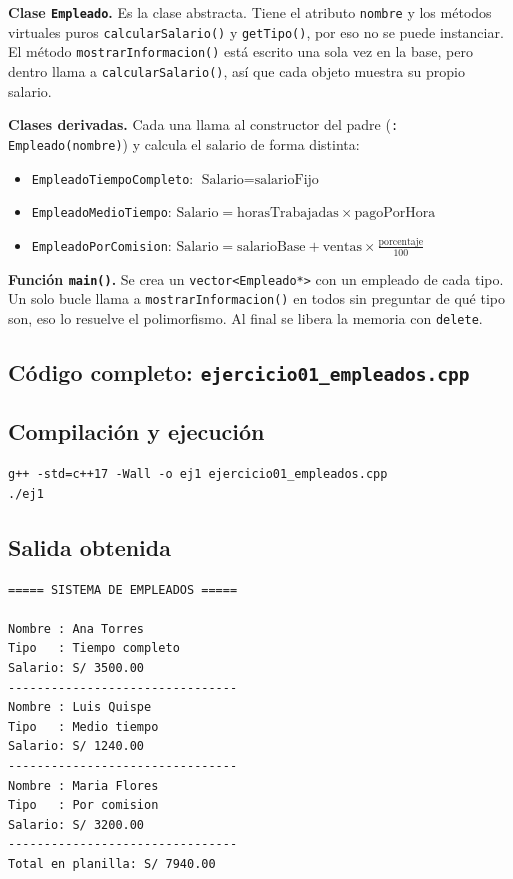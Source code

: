 \documentclass[12pt]{article}
\begin{document}
\textbf{Clase \texttt{Empleado}.} Es la clase abstracta. Tiene el atributo \texttt{nombre} y los métodos virtuales puros \texttt{calcularSalario()} y \texttt{getTipo()}, por eso no se puede instanciar. El método \texttt{mostrarInformacion()} está escrito una sola vez en la base, pero dentro llama a \texttt{calcularSalario()}, así que cada objeto muestra su propio salario.

\textbf{Clases derivadas.} Cada una llama al constructor del padre (\texttt{: Empleado(nombre)}) y calcula el salario de forma distinta:
\begin{itemize}[leftmargin=0.5cm]
    \item \texttt{EmpleadoTiempoCompleto}: $\text{Salario} = \text{salarioFijo}$
    \item \texttt{EmpleadoMedioTiempo}: $\text{Salario} = \text{horasTrabajadas} \times \text{pagoPorHora}$
    \item \texttt{EmpleadoPorComision}: $\text{Salario} = \text{salarioBase} + \text{ventas} \times \frac{\text{porcentaje}}{100}$
\end{itemize}

\textbf{Función \texttt{main()}.} Se crea un \texttt{vector<Empleado*>} con un empleado de cada tipo. Un solo bucle llama a \texttt{mostrarInformacion()} en todos sin preguntar de qué tipo son, eso lo resuelve el polimorfismo. Al final se libera la memoria con \texttt{delete}.

\subsection*{Código completo: \texttt{ejercicio01\_empleados.cpp}}



\subsection*{Compilación y ejecución}

\begin{lstlisting}[style=consola]
g++ -std=c++17 -Wall -o ej1 ejercicio01_empleados.cpp
./ej1
\end{lstlisting}

\subsection*{Salida obtenida}

\begin{lstlisting}[style=consola]
===== SISTEMA DE EMPLEADOS =====

Nombre : Ana Torres
Tipo   : Tiempo completo
Salario: S/ 3500.00
--------------------------------
Nombre : Luis Quispe
Tipo   : Medio tiempo
Salario: S/ 1240.00
--------------------------------
Nombre : Maria Flores
Tipo   : Por comision
Salario: S/ 3200.00
--------------------------------
Total en planilla: S/ 7940.00
\end{lstlisting}
\end{document}
